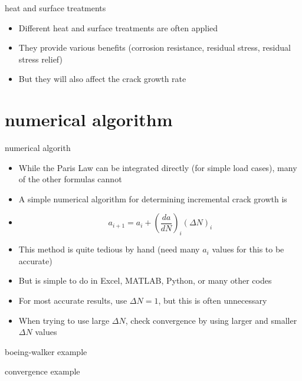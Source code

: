 \documentclass[10pt]{beamer}
\begin{document}
\begin{frame}{heat and surface treatments}
	\begin{itemize}[<+->]
		\item Different heat and surface treatments are often applied
		\item They provide various benefits (corrosion resistance, residual stress, residual stress relief)
		\item But they will also affect the crack growth rate
	\end{itemize}
\end{frame}

\section{numerical algorithm}

\begin{frame}{numerical algorith}
\begin{itemize}[<+->]
	\item While the Paris Law can be integrated directly (for simple load cases), many of the other formulas cannot
	\item A simple numerical algorithm for determining incremental crack growth is
	\item[]	\begin{equation}
	a_{i+1} = a_i + \left(\frac{da}{dN}\right)_i\left(\Delta N\right)_i
	\end{equation}
	\item This method is quite tedious by hand (need many $a_i$ values for this to be accurate) 
	\item But is simple to do in Excel, MATLAB, Python, or many other codes
	\item For most accurate results, use $\Delta N = 1$, but this is often unnecessary
	\item When trying to use large $\Delta N$, check convergence by using larger and smaller $\Delta N$ values
\end{itemize}
\end{frame}

\begin{frame}{boeing-walker example}
	
\end{frame}

\begin{frame}{convergence example}
	
\end{frame}
\end{document}

